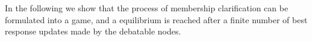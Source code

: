 \documentclass[10pt,journal,compsoc]{IEEEtran}
\theoremstyle{mytheoremstyle}
\theoremstyle{mytheoremstyle}
\theoremstyle{mytheoremstyle}
\begin{document}
%
In the following we show that the process of membership clarification can be formulated into a game, and a equilibrium is reached after a finite number of best response updates made by the debatable nodes.
\end{document}
